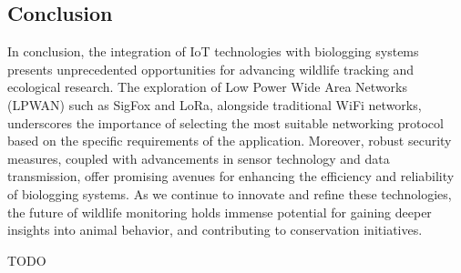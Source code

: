 \documentclass[sigplan,screen,nonacm]{acmart}
\begin{document}
\subsection{Conclusion}
\label{sec:Conclusion}

In conclusion, the integration of IoT technologies with biologging systems presents unprecedented opportunities for 
advancing wildlife tracking and ecological research. The exploration of Low Power Wide Area Networks (LPWAN) such 
as SigFox and LoRa, alongside traditional WiFi networks, underscores the importance of selecting the most suitable 
networking protocol based on the specific requirements of the application. Moreover, robust security measures, coupled 
with advancements in sensor technology and data transmission, offer promising avenues for enhancing the efficiency 
and reliability of biologging systems. As we continue to innovate and refine these technologies, the future of 
wildlife monitoring holds immense potential for gaining deeper insights into animal behavior, and contributing to 
conservation initiatives.

\begin{acks}
  TODO
\end{acks}



\end{document}
